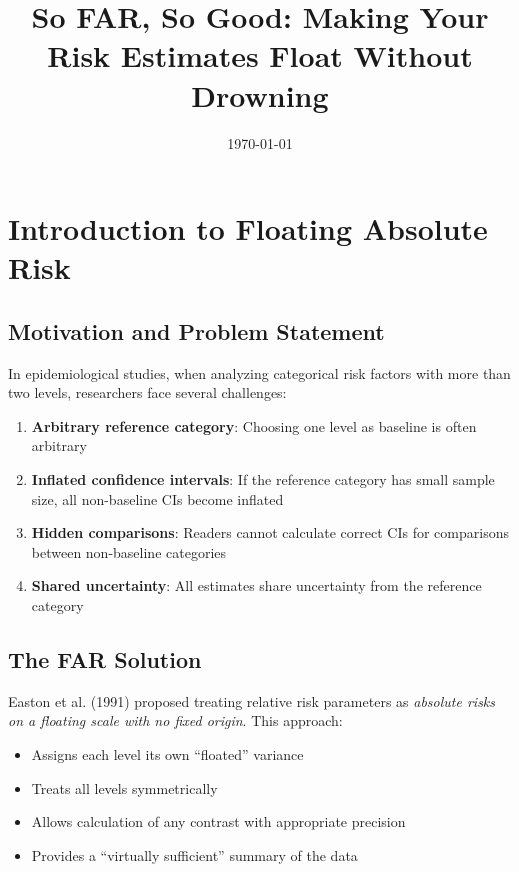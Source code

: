 \documentclass[11pt]{article}
\title{So FAR, So Good: Making Your Risk Estimates Float Without Drowning}
\author{}
\date{\today}
\begin{document}
\maketitle

\tableofcontents
\newpage

\section{Introduction to Floating Absolute Risk}

\subsection{Motivation and Problem Statement}

In epidemiological studies, when analyzing categorical risk factors with more than two levels, researchers face several challenges:

\begin{enumerate}
    \item \textbf{Arbitrary reference category}: Choosing one level as baseline is often arbitrary
    \item \textbf{Inflated confidence intervals}: If the reference category has small sample size, all non-baseline CIs become inflated
    \item \textbf{Hidden comparisons}: Readers cannot calculate correct CIs for comparisons between non-baseline categories
    \item \textbf{Shared uncertainty}: All estimates share uncertainty from the reference category
\end{enumerate}

\subsection{The FAR Solution}

Easton et al. (1991) proposed treating relative risk parameters as \textit{absolute risks on a floating scale with no fixed origin}. This approach:
\begin{itemize}
    \item Assigns each level its own ``floated'' variance
    \item Treats all levels symmetrically
    \item Allows calculation of any contrast with appropriate precision
    \item Provides a ``virtually sufficient'' summary of the data
\end{itemize}
\end{document}
